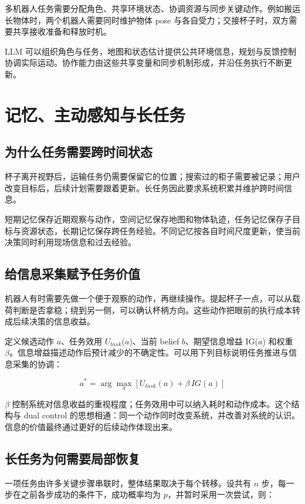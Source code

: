 \documentclass[UTF8,a4paper,11pt,oneside,openany,fontset=none]{ctexbook}
\begin{document}
多机器人任务需要分配角色、共享环境状态、协调资源与同步关键动作。例如搬运长物体时，两个机器人需要同时维护物体 pose 与各自受力；交接杯子时，双方需要共享接收准备和释放时机。

LLM 可以组织角色与任务，地图和状态估计提供公共环境信息，规划与反馈控制协调实际运动。协作能力由这些共享变量和同步机制形成，并沿任务执行不断更新。

\chapter{记忆、主动感知与长任务}

\section{为什么任务需要跨时间状态}

杯子离开视野后，运输任务仍需要保留它的位置；搜索过的柜子需要被记录；用户改变目标后，后续计划需要跟着更新。长任务因此要求系统积累并维护跨时间信息。

短期记忆保存近期观察与动作，空间记忆保存地图和物体轨迹，任务记忆保存子目标与资源状态，长期记忆保存跨任务经验。不同记忆按各自时间尺度更新，使当前决策同时利用现场信息和过去经验。

\section{给信息采集赋予任务价值}

机器人有时需要先做一个便于观察的动作，再继续操作。提起杯子一点，可以从载荷判断是否拿稳；绕到另一侧，可以确认杯柄方向。这些动作把眼前的执行成本转成后续决策的信息收益。

定义候选动作 \(a\)、任务效用 \(U_{task}\)(\(a\))、当前 belief \(b\)、期望信息增益 IG(\(a\)) 和权重 \(\beta\)。信息增益描述动作后预计减少的不确定性。可以用下列目标说明任务推进与信息采集的协调：

\[
a^*=\arg\max_a\left[U_{task}(a)+\beta\,IG(a)\right]
\]

\(\beta\) 控制系统对信息收益的重视程度；任务效用中可以纳入耗时和动作成本。这个结构与 dual control 的思想相通：同一个动作同时改变系统，并改善对系统的认识。信息的价值最终通过更好的后续动作体现出来。

\section{长任务为何需要局部恢复}

一项任务由许多关键步骤串联时，整体结果取决于每个转移。设共有 \(n\) 步，每一步在之前各步成功的条件下，成功概率均为 \(p\)，并暂时采用一次尝试，则：
\end{document}
